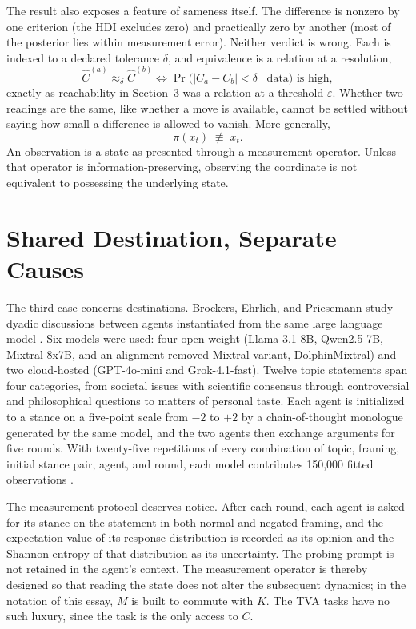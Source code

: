 \documentclass[11pt]{article}
\theoremstyle{definition}
\theoremstyle{remark}
\begin{document}
The result also exposes a feature of sameness itself. The difference is nonzero by one criterion (the HDI excludes zero) and practically zero by another (most of the posterior lies within measurement error). Neither verdict is wrong. Each is indexed to a declared tolerance $\delta$, and equivalence is a relation at a resolution,
\begin{equation}
\hat{C}^{(a)} \approx_\delta \hat{C}^{(b)} \iff \Pr\big(|C_a - C_b| < \delta \mid \text{data}\big) \text{ is high},
\end{equation}
exactly as reachability in Section~3 was a relation at a threshold $\varepsilon$. Whether two readings are the same, like whether a move is available, cannot be settled without saying how small a difference is allowed to vanish. More generally,
\begin{equation}
\pi(x_t) \;\not\equiv\; x_t .
\end{equation}
An observation is a state as presented through a measurement operator. Unless that operator is information-preserving, observing the coordinate is not equivalent to possessing the underlying state.

\section{Shared Destination, Separate Causes}

The third case concerns destinations. Brockers, Ehrlich, and Priesemann study dyadic discussions between agents instantiated from the same large language model \cite{brockers2026}. Six models were used: four open-weight (Llama-3.1-8B, Qwen2.5-7B, Mixtral-8x7B, and an alignment-removed Mixtral variant, DolphinMixtral) and two cloud-hosted (GPT-4o-mini and Grok-4.1-fast). Twelve topic statements span four categories, from societal issues with scientific consensus through controversial and philosophical questions to matters of personal taste. Each agent is initialized to a stance on a five-point scale from $-2$ to $+2$ by a chain-of-thought monologue generated by the same model, and the two agents then exchange arguments for five rounds. With twenty-five repetitions of every combination of topic, framing, initial stance pair, agent, and round, each model contributes 150{,}000 fitted observations \cite{brockers2026peer}.

The measurement protocol deserves notice. After each round, each agent is asked for its stance on the statement in both normal and negated framing, and the expectation value of its response distribution is recorded as its opinion and the Shannon entropy of that distribution as its uncertainty. The probing prompt is not retained in the agent's context. The measurement operator is thereby designed so that reading the state does not alter the subsequent dynamics; in the notation of this essay, $M$ is built to commute with $K$. The TVA tasks have no such luxury, since the task is the only access to $C$.
\end{document}
